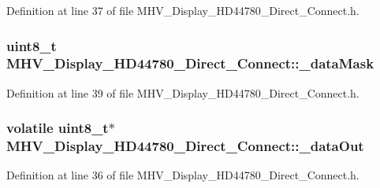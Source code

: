 \-Definition at line 37 of file \-M\-H\-V\-\_\-\-Display\-\_\-\-H\-D44780\-\_\-\-Direct\-\_\-\-Connect.\-h.

\hypertarget{class_m_h_v___display___h_d44780___direct___connect_afbadbde61cef93fe49e29e4b4de37ea2}{
\subsubsection[{\-\_\-data\-Mask}]{\setlength{\rightskip}{0pt plus 5cm}uint8\-\_\-t {\bf \-M\-H\-V\-\_\-\-Display\-\_\-\-H\-D44780\-\_\-\-Direct\-\_\-\-Connect\-::\-\_\-data\-Mask}}}
\label{class_m_h_v___display___h_d44780___direct___connect_afbadbde61cef93fe49e29e4b4de37ea2}


\-Definition at line 39 of file \-M\-H\-V\-\_\-\-Display\-\_\-\-H\-D44780\-\_\-\-Direct\-\_\-\-Connect.\-h.

\hypertarget{class_m_h_v___display___h_d44780___direct___connect_aebdad9827430f3471e92c96ac162a0e8}{
\subsubsection[{\-\_\-data\-Out}]{\setlength{\rightskip}{0pt plus 5cm}volatile uint8\-\_\-t$\ast$ {\bf \-M\-H\-V\-\_\-\-Display\-\_\-\-H\-D44780\-\_\-\-Direct\-\_\-\-Connect\-::\-\_\-data\-Out}}}
\label{class_m_h_v___display___h_d44780___direct___connect_aebdad9827430f3471e92c96ac162a0e8}


\-Definition at line 36 of file \-M\-H\-V\-\_\-\-Display\-\_\-\-H\-D44780\-\_\-\-Direct\-\_\-\-Connect.\-h.

